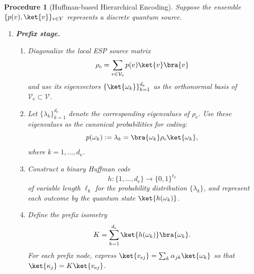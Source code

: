 \documentclass[conference]{IEEEtran}
\newtheorem{procedure}{Procedure}
\begin{document}
\begin{procedure}[Huffman-based Hierarchical Encoding]\label{procedure_hirearchical-coding}
Suppose the ensemble $\{p(v),\ket{v}\}_{v\in V}$ represents a discrete quantum source.

\begin{enumerate}[label=\textbf{\arabic*)}]
\item \textbf{Prefix stage.}

\begin{enumerate}[label=(\alph*)]
\item Diagonalize the local ESP source matrix
\[
\rho_\mathrm{e}=\sum_{v\in\mathcal{V}_\mathrm{e}} p(v)\ket{v}\bra{v}
\]
and use its eigenvectors $\{\ket{\omega_k}\}_{k=1}^{d_{\mathrm{e}}}$ as the orthonormal basis of $\mathcal{V}_{\mathrm{e}}\subset \mathcal{V}$.

\item Let $\{\lambda_k\}_{k=1}^{d_{\mathrm{e}}}$ denote the corresponding eigenvalues of $\rho_\mathrm{e}$. Use these eigenvalues as the canonical probabilities for coding:
\[
p(\omega_k):=\lambda_k=\bra{\omega_k}\rho_\mathrm{e}\ket{\omega_k},
\]
where $k=1,\dots,d_{\mathrm{e}}$.
\item Construct a binary Huffman code
\[
h:\{1,\dots,d_{\mathrm{e}}\}\rightarrow\{0,1\}^{\ell_k}
\]
of variable length $\ell_k$ for the probability distribution \(\{\lambda_k\}\), and represent each outcome by the quantum state \(\ket{h(\omega_k)}\).
\item Define the prefix isometry
\[
K=\sum_{k=1}^{d_{\mathrm{e}}}\ket{h(\omega_k)}\bra{\omega_k}.
\]
For each prefix node, express
$\ket{v_{\mathrm{e}j}}=\sum_k \alpha_{jk}\ket{\omega_k}$ so that 
$\ket{\kappa_j}=K\ket{v_{\mathrm{e}j}}$.
\end{enumerate}


\end{enumerate}
\end{procedure}
\end{document}
